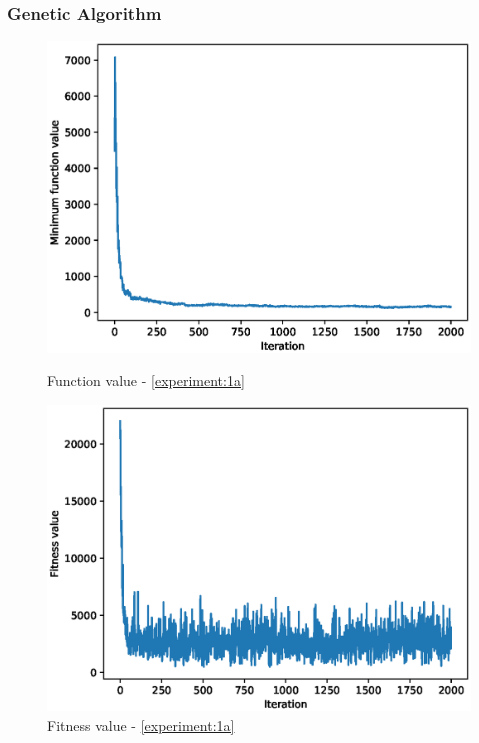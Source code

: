 \documentclass{article}
\begin{document}
\subsubsection{Genetic Algorithm}
\begin{figure}[!htbp]
	\centering
	\begin{minipage}{.48\textwidth}
		\centering
		\includegraphics[scale=.4]{experiment_1a_rosenbrock/min_eval_0.eps}
		\caption{Function value - \ref{experiment:1a}}
	\end{minipage}\hfill
	\begin{minipage}{.48\textwidth}
		\centering
		\includegraphics[scale=.4]{experiment_1a_rosenbrock/max_fitness_0.eps}
		\caption{Fitness value - \ref{experiment:1a}}
	\end{minipage}
\end{figure}
\FloatBarrier
\end{document}
